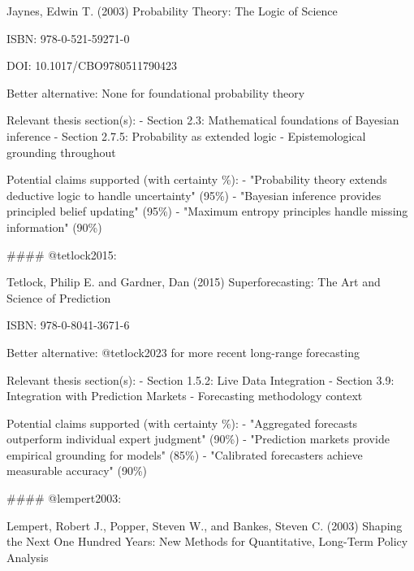 \documentclass[
  11pt,
  letterpaper,
]{book}
\newenvironment{Shaded}{\begin{snugshade}}{\end{snugshade}}
\newcommand{\FunctionTok}[1]{\textcolor[rgb]{0.28,0.35,0.67}{#1}}
\newcommand{\InformationTok}[1]{\textcolor[rgb]{0.37,0.37,0.37}{#1}}
\begin{document}
\begin{Shaded}
\begin{Highlighting}[]
\InformationTok{    Jaynes, Edwin T. (2003)}
\InformationTok{    Probability Theory: The Logic of Science}

\InformationTok{    ISBN: 978{-}0{-}521{-}59271{-}0}

\InformationTok{    DOI: 10.1017/CBO9780511790423}

\InformationTok{    Better alternative: None for foundational probability theory}

\InformationTok{    Relevant thesis section(s):}
\InformationTok{    {-} Section 2.3: Mathematical foundations of Bayesian inference}
\InformationTok{    {-} Section 2.7.5: Probability as extended logic}
\InformationTok{    {-} Epistemological grounding throughout}

\InformationTok{    Potential claims supported (with certainty \%):}
\InformationTok{    {-} "Probability theory extends deductive logic to handle uncertainty" (95\%)}
\InformationTok{    {-} "Bayesian inference provides principled belief updating" (95\%)}
\InformationTok{    {-} "Maximum entropy principles handle missing information" (90\%)}

\FunctionTok{\#\#\#\# \textasciigrave{}@tetlock2015\textasciigrave{}: }

\InformationTok{    Tetlock, Philip E. and Gardner, Dan (2015)}
\InformationTok{    Superforecasting: The Art and Science of Prediction}

\InformationTok{    ISBN: 978{-}0{-}8041{-}3671{-}6}

\InformationTok{    Better alternative: @tetlock2023 for more recent long{-}range forecasting}

\InformationTok{    Relevant thesis section(s):}
\InformationTok{    {-} Section 1.5.2: Live Data Integration}
\InformationTok{    {-} Section 3.9: Integration with Prediction Markets}
\InformationTok{    {-} Forecasting methodology context}

\InformationTok{    Potential claims supported (with certainty \%):}
\InformationTok{    {-} "Aggregated forecasts outperform individual expert judgment" (90\%)}
\InformationTok{    {-} "Prediction markets provide empirical grounding for models" (85\%)}
\InformationTok{    {-} "Calibrated forecasters achieve measurable accuracy" (90\%)}

\FunctionTok{\#\#\#\# \textasciigrave{}@lempert2003\textasciigrave{}: }

\InformationTok{    Lempert, Robert J., Popper, Steven W., and Bankes, Steven C. (2003)}
\InformationTok{    Shaping the Next One Hundred Years: New Methods for Quantitative, Long{-}Term Policy Analysis}


\end{Highlighting}
\end{Shaded}
\end{document}
